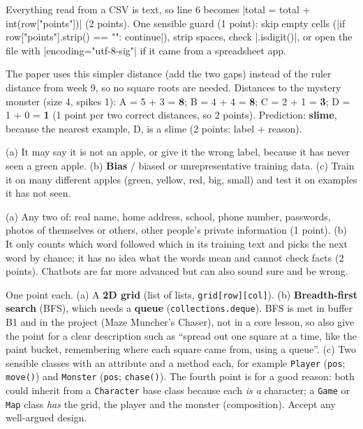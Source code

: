 \begin{answer}
Everything read from a CSV is text, so line 6 becomes \py|total = total + int(row["points"])|
(2 points). One sensible guard (1 point): skip empty cells
(\py|if row["points"].strip() == "": continue|), strip spaces, check \py|.isdigit()|, or open
the file with \py|encoding="utf-8-sig"| if it came from a spreadsheet app.
\end{answer}

\begin{answer}
The paper uses this simpler distance (add the two gaps) instead of the ruler distance from
week 9, so no square roots are needed. Distances to the mystery monster (size 4, spikes 1): A = 5 + 3 = \textbf{8}; B = 4 + 4 = \textbf{8};
C = 2 + 1 = \textbf{3}; D = 1 + 0 = \textbf{1} (1 point per two correct distances, so 2 points).
Prediction: \textbf{slime}, because the nearest example, D, is a slime (2 points: label + reason).
\end{answer}

\begin{answer}
(a) It may say it is not an apple, or give it the wrong label, because it has never seen a green
apple. (b) \textbf{Bias} / biased or unrepresentative training data. (c) Train it on many
different apples (green, yellow, red, big, small) and test it on examples it has not seen.
\end{answer}

\begin{answer}
(a) Any two of: real name, home address, school, phone number, passwords, photos of themselves or
others, other people's private information (1 point). (b) It only counts which word followed which
in its training text and picks the next word by chance; it has no idea what the words mean and
cannot check facts (2 points). Chatbots are far more advanced but can also sound sure and be wrong.
\end{answer}

\begin{answer}
One point each. (a) A \textbf{2D grid} (list of lists, \texttt{grid[row][col]}). (b)
\textbf{Breadth-first search} (BFS), which needs a \textbf{queue} (\texttt{collections.deque}).
BFS is met in buffer B1 and in the project (Maze Muncher's Chaser), not in a core lesson, so also
give the point for a clear description such as \enquote{spread out one square at a time, like the
paint bucket, remembering where each square came from, using a queue}.
(c) Two sensible classes with an attribute and a method each, for example \texttt{Player}
(\texttt{pos}; \texttt{move()}) and \texttt{Monster} (\texttt{pos}; \texttt{chase()}). The fourth point is for a good
reason: both could inherit from a \texttt{Character} base class because each \emph{is a}
character; a \texttt{Game} or \texttt{Map} class \emph{has} the grid, the player and the monster
(composition). Accept any well-argued design.
\end{answer}

